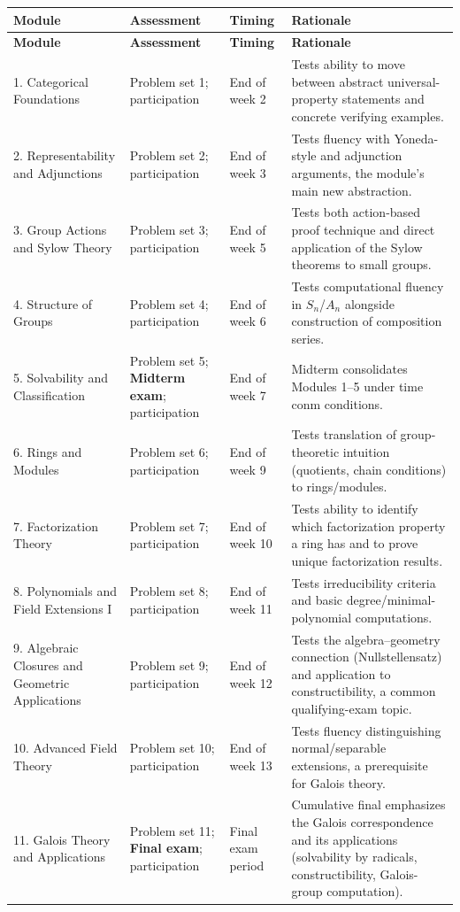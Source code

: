 \documentclass{article}
\begin{document}
\begin{longtable}{p{2.8cm} p{3.6cm} p{2.6cm} p{5.2cm}}
\toprule
\textbf{Module} & \textbf{Assessment} & \textbf{Timing} & \textbf{Rationale} \\
\midrule
\endfirsthead
\toprule
\textbf{Module} & \textbf{Assessment} & \textbf{Timing} & \textbf{Rationale} \\
\midrule
\endhead
1. Categorical Foundations & Problem set 1; participation & End of week 2 & Tests ability to move between abstract universal-property statements and concrete verifying examples. \\
2. Representability and Adjunctions & Problem set 2; participation & End of week 3 & Tests fluency with Yoneda-style and adjunction arguments, the module's main new abstraction. \\
3. Group Actions and Sylow Theory & Problem set 3; participation & End of week 5 & Tests both action-based proof technique and direct application of the Sylow theorems to small groups. \\
4. Structure of Groups & Problem set 4; participation & End of week 6 & Tests computational fluency in $S_n$/$A_n$ alongside construction of composition series. \\
5. Solvability and Classification & Problem set 5; \textbf{Midterm exam}; participation & End of week 7 & Midterm consolidates Modules 1--5 under time conm conditions. \\
6. Rings and Modules & Problem set 6; participation & End of week 9 & Tests translation of group-theoretic intuition (quotients, chain conditions) to rings/modules. \\
7. Factorization Theory & Problem set 7; participation & End of week 10 & Tests ability to identify which factorization property a ring has and to prove unique factorization results. \\
8. Polynomials and Field Extensions I & Problem set 8; participation & End of week 11 & Tests irreducibility criteria and basic degree/minimal-polynomial computations. \\
9. Algebraic Closures and Geometric Applications & Problem set 9; participation & End of week 12 & Tests the algebra--geometry connection (Nullstellensatz) and application to constructibility, a common qualifying-exam topic. \\
10. Advanced Field Theory & Problem set 10; participation & End of week 13 & Tests fluency distinguishing normal/separable extensions, a prerequisite for Galois theory. \\
11. Galois Theory and Applications & Problem set 11; \textbf{Final exam}; participation & Final exam period & Cumulative final emphasizes the Galois correspondence and its applications (solvability by radicals, constructibility, Galois-group computation). \\
\bottomrule
\end{longtable}
\end{document}
